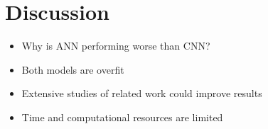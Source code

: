 \section{Discussion}

\begin{itemize}
    \item Why is ANN performing worse than CNN?
    \item Both models are overfit
    \item Extensive studies of related work could improve results
    \item Time and computational resources are limited
\end{itemize}